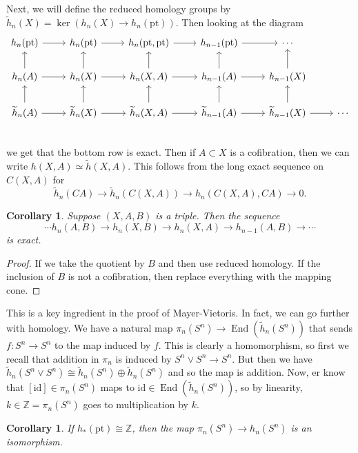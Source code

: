 \documentclass[leqno, openany]{memoir}
\newtheorem{cor}[thm]{Corollary}
\theoremstyle{definition}
\theoremstyle{remark}
\theoremstyle{plain}
\theoremstyle{definition}
\theoremstyle{remark}
\newcommand{\Z}{\mathbb{Z}}
\newcommand{\mr}[1]{\mathrm{#1}}
\newcommand{\wt}[1]{\widetilde{#1}}
\DeclareMathOperator{\End}{End}
\begin{document}
Next, we will define the reduced homology groups by $\wt{h}_n(X) = \ker (h_n(X) \to h_n(\mr{pt}))$. Then looking at the diagram
\begin{equation*}
\begin{tikzcd}
    h_n(\mr{pt}) \arrow{r} & h_n(\mr{pt}) \arrow{r} & h_n(\mr{pt}, \mr{pt}) \arrow{r} & h_{n-1}(\mr{pt}) \arrow{r} & \cdots \\
    h_n(A) \arrow{r} \arrow{u} & h_n(X) \arrow{r} \arrow{u} & h_n(X,A) \arrow{r} \arrow{u} & h_{n-1}(A) \arrow{r} \arrow{u} & h_{n-1}(X) \arrow{u} \\ 
    \wt{h}_n(A) \arrow{r} \arrow{u} & \wt{h}_n(X) \arrow{r} \arrow{u} & \wt{h}_n(X,A) \arrow{r} \arrow{u} & \wt{h}_{n-1}(A) \arrow{r} \arrow{u} & \wt{h}_{n-1}(X) \arrow{r} \arrow{u} & \cdots \\ 
\end{tikzcd}
\end{equation*}
we get that the bottom row is exact. Then if $A \subset X$ is a cofibration, then we can write $h(X,A) \simeq \wt{h}(X,A)$. This follows from the long exact sequence on $C(X,A)$ for 
\[ \wt{h}_n(CA) \to \wt{h}_n(C(X,A)) \to h_n(C(X,A), CA) \to 0. \]

\begin{cor}
    Suppose $(X,A,B)$ is a triple. Then the sequence
    \[ \cdots h_n(A,B) \to h_n(X,B) \to h_n(X,A) \to h_{n-1}(A,B) \to \cdots \]
    is exact.
\end{cor}

\begin{proof}
    If we take the quotient by $B$ and then use reduced homology. If the inclusion of $B$ is not a cofibration, then replace everything with the mapping cone.
\end{proof}

This is a key ingredient in the proof of Mayer-Vietoris. In fact, we can go further with homology. We have a natural map $\pi_n(S^n)\to \End(\wt{h}_n(S^n))$ that sends $f \colon S^n \to S^n$ to the map induced by $f$. This is clearly a homomorphism, so first we recall that addition in $\pi_n$ is induced by $S^n \vee S^n \to S^n$. But then we have $\wt{h}_n(S^n \vee S^n) \cong \wt{h}_n(S^n) \oplus \wt{h}_n(S^n)$ and so the map is addition. Now, er know that $[\mr{id}] \in \pi_n(S^n)$ maps to $\mr{id} \in \End(\wt{h}_n(S^n))$, so by linearity, $k \in \Z = \pi_n(S^n)$ goes to multiplication by $k$.

\begin{cor}
    If $h_*(\mr{pt}) \cong \Z$, then the map $\pi_n(S^n) \to h_n(S^n)$ is an isomorphism.
\end{cor}
\end{document}
